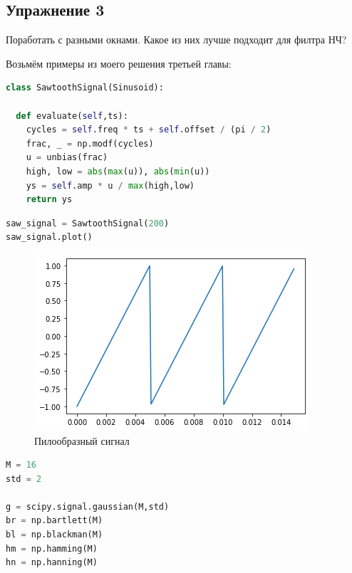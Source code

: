 \subsection{Упражнение 3}

Поработать с разными окнами. Какое из них лучше подходит для филтра НЧ?

Возьмём примеры из моего решения третьей главы:

\begin{lstlisting}[language=Python]
class SawtoothSignal(Sinusoid):

  def evaluate(self,ts):
    cycles = self.freq * ts + self.offset / (pi / 2)
    frac, _ = np.modf(cycles)
    u = unbias(frac)
    high, low = abs(max(u)), abs(min(u))
    ys = self.amp * u / max(high,low)
    return ys
\end{lstlisting}

\begin{lstlisting}[language=Python]
saw_signal = SawtoothSignal(200)
saw_signal.plot()
\end{lstlisting}
\begin{figure}[H]
	\begin{center}
		\includegraphics[scale=1]{fig/lab08/lab08_18_0.png}
		\caption{Пилообразный сигнал}
	\end{center}
\end{figure}

\begin{lstlisting}[language=Python]
M = 16
std = 2

g = scipy.signal.gaussian(M,std)
br = np.bartlett(M)
bl = np.blackman(M)
hm = np.hamming(M)
hn = np.hanning(M)
\end{lstlisting}

